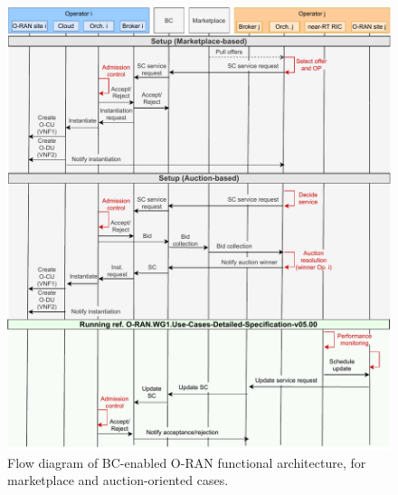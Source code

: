 \documentclass[journal]{IEEEtran}
\begin{document}

\begin{figure}[ht!]
\centering
\includegraphics[width=1\columnwidth]{flowdiagram_complete.pdf}
\caption{Flow diagram of BC-enabled O-RAN functional architecture, for marketplace and auction-oriented cases.}
\label{fig:functionalarchitectureflowdiagram}
\end{figure}

\end{document}
